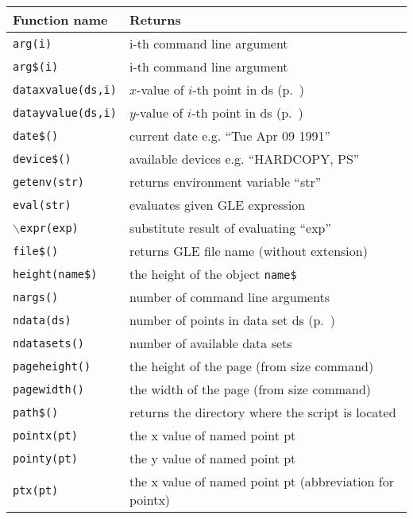 \begin{supertabular}{ll} \hline
Function name     & Returns  \\ \hline
{\tt arg(i)}        	    & i-th command line argument \\
{\tt arg\$(i)}             & i-th command line argument \\
{\tt dataxvalue(ds,i)}  & $x$-value of $i$-th point in ds (p.~\pageref{dataxvalue})\\
{\tt datayvalue(ds,i)}  & $y$-value of $i$-th point in ds (p.~\pageref{datayvalue})\\
{\tt date\$()}       	& current date e.g. ``Tue Apr 09 1991'' \\
{\tt device\$()}   	& available devices e.g. ``HARDCOPY, PS''\\
{\tt getenv(str)}       & returns environment variable ``str''\\
{\tt eval(str)}          	& evaluates given GLE expression \\
{\tt $\backslash{}$expr(exp)}  & substitute result of evaluating ``exp'' \\
{\tt file\$()}          & returns GLE file name (without extension) \\
{\tt height(name\$)}  	& the height of the object {\tt name\$} \\
{\tt nargs()}        	& number of command line arguments \\
{\tt ndata(ds)}            & number of points in data set ds (p.~\pageref{ndata})\\
{\tt ndatasets()}      & number of available data sets\\
{\tt pageheight()}  & the height of the page (from size command) \\
{\tt pagewidth()} 	& the width of the page (from size command) \\
{\tt path\$()}          & returns the directory where the script is located \\
{\tt pointx(pt)}     	& the x value of named point pt \\
{\tt pointy(pt)}     	& the y value of named point pt \\
{\tt ptx(pt)}           	& the x value of named point pt (abbreviation for pointx) \\

\end{supertabular}
